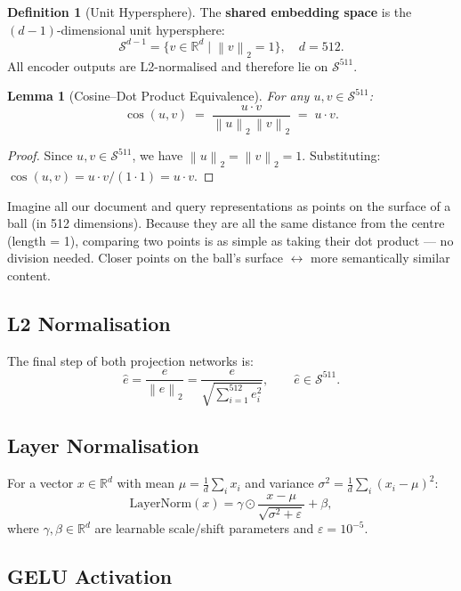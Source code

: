\documentclass[12pt,a4paper]{article}
\theoremstyle{definition}
\newtheorem{definition}{Definition}[section]
\theoremstyle{plain}
\newtheorem{lemma}[theorem]{Lemma}
\theoremstyle{remark}
\newcommand{\R}{\mathbb{R}}
\newcommand{\Sph}{\mathcal{S}}
\newcommand{\Norm}[1]{\left\|#1\right\|_2}
\newcommand{\LN}{\mathrm{LayerNorm}}
\begin{document}
\begin{definition}[Unit Hypersphere]
The \textbf{shared embedding space} is the $(d{-}1)$-dimensional unit hypersphere:
\[
  \Sph^{d-1} = \bigl\{v \in \R^d \;\big|\; \Norm{v} = 1\bigr\}, \quad d = 512.
\]
All encoder outputs are L2-normalised and therefore lie on $\Sph^{511}$.
\end{definition}

\begin{lemma}[Cosine–Dot Product Equivalence]
  \label{lem:cosdot}
  For any $u, v \in \Sph^{511}$:
  \[
    \cos(u, v) \;=\; \frac{u \cdot v}{\Norm{u}\,\Norm{v}} \;=\; u \cdot v.
  \]
\end{lemma}
\begin{proof}
  Since $u, v \in \Sph^{511}$, we have $\Norm{u} = \Norm{v} = 1$.
  Substituting: $\cos(u,v) = u\cdot v / (1 \cdot 1) = u \cdot v$.
\end{proof}

\begin{tcolorbox}[laymanbox]
Imagine all our document and query representations as points on the surface
of a ball (in 512 dimensions). Because they are all the same distance from the
centre (length = 1), comparing two points is as simple as taking their dot
product — no division needed. Closer points on the ball's surface
$\leftrightarrow$ more semantically similar content.
\end{tcolorbox}

\subsection{L2 Normalisation}

The final step of both projection networks is:
\[
  \hat{e} = \frac{e}{\Norm{e}} = \frac{e}{\sqrt{\sum_{i=1}^{512} e_i^2}}, \qquad \hat{e} \in \Sph^{511}.
\]

\subsection{Layer Normalisation}

For a vector $x \in \R^d$ with mean $\mu = \frac{1}{d}\sum_i x_i$
and variance $\sigma^2 = \frac{1}{d}\sum_i (x_i - \mu)^2$:
\[
  \LN(x) = \gamma \odot \frac{x - \mu}{\sqrt{\sigma^2 + \varepsilon}} + \beta,
\]
where $\gamma, \beta \in \R^d$ are learnable scale/shift parameters
and $\varepsilon = 10^{-5}$.

\subsection{GELU Activation}
\end{document}
